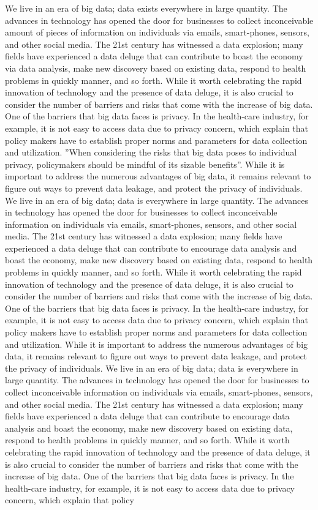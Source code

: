 \documentclass[sigconf]{acmart}
\begin{document}
We live in an era of big data; data exists everywhere in large quantity. The advances in technology has opened the door for businesses to collect inconceivable amount of pieces of information on individuals via emails, smart-phones, sensors, and other social media. The 21st century has witnessed a data explosion; many fields have experienced a data deluge that can contribute to boast the economy via data analysis, make new discovery based on existing data, respond to health problems in quickly manner, and so forth. While it worth celebrating the rapid innovation of technology and the presence of data deluge, it is also crucial to consider the number of barriers and risks that come with the increase of big data. One of the barriers that big data faces is privacy. In the health-care industry, for example, it is not easy to access data due to privacy concern, which explain that policy makers have to establish proper norms and parameters for data collection and utilization. ''When considering the risks that big data poses to individual privacy, policymakers should be mindful of its sizable benefits''\cite{tene2012big}. While it is important to address the numerous advantages of big data, it remains relevant to figure out ways to prevent data leakage, and protect the privacy of individuals. We live in an era of big data; data is everywhere in large quantity. The advances in technology has opened the door for businesses to collect inconceivable information on individuals via emails, smart-phones, sensors, and other social media. The 21st century has witnessed a data explosion; many fields have experienced a data deluge that can contribute to encourage data analysis and boast the economy, make new discovery based on existing data, respond to health problems in quickly manner, and so forth. While it worth celebrating the rapid innovation of technology and the presence of data deluge, it is also crucial to consider the number of barriers and risks that come with the increase of big data. One of the barriers that big data faces is privacy. In the health-care industry, for example, it is not easy to access data due to privacy concern, which explain that policy makers have to establish proper norms and parameters for data collection and utilization. While it is important to address the numerous advantages of big data, it remains relevant to figure out ways to prevent data leakage, and protect the privacy of individuals.  We live in an era of big data; data is everywhere in large quantity. The advances in technology has opened the door for businesses to collect inconceivable information on individuals via emails, smart-phones, sensors, and other social media. The 21st century has witnessed a data explosion; many fields have experienced a data deluge that can contribute to encourage data analysis and boast the economy, make new discovery based on existing data, respond to health problems in quickly manner, and so forth. While it worth celebrating the rapid innovation of technology and the presence of data deluge, it is also crucial to consider the number of barriers and risks that come with the increase of big data. One of the barriers that big data faces is privacy. In the health-care industry, for example, it is not easy to access data due to privacy concern, which explain that policy 
\end{document}
